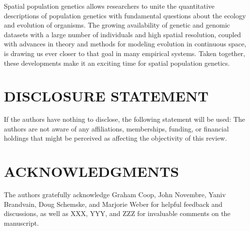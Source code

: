 \documentclass{ar-1col}
\begin{document}
Spatial population genetics allows researchers to 
unite the quantitative descriptions of population genetics 
with fundamental questions about the ecology and evolution of organisms.
The growing availability of genetic and genomic datasets 
with a large number of individuals and high spatial resolution, 
coupled with advances in theory and methods 
for modeling evolution in continuous space, 
is drawing us ever closer to that goal in many empirical systems.
Taken together, these developments make it 
an exciting time for spatial population genetics.



\section*{DISCLOSURE STATEMENT}
If the authors have nothing to disclose, the following statement will be used: 
The authors are not aware of any affiliations, memberships, funding, or financial holdings 
that might be perceived as affecting the objectivity of this review.

\section*{ACKNOWLEDGMENTS}
The authors gratefully acknowledge 
Graham Coop, John Novembre, 
Yaniv Brandvain, Doug Schemske, and Marjorie Weber 
for helpful feedback and discussions, 
as well as XXX, YYY, and ZZZ for invaluable comments on the manuscript.



\end{document}
